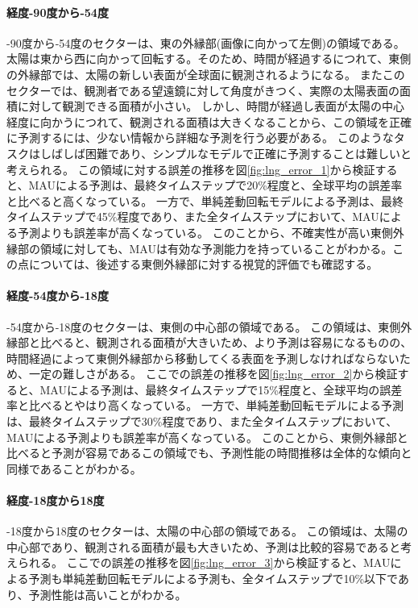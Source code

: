           \paragraph{経度-90度から-54度}
          -90度から-54度のセクターは、東の外縁部(画像に向かって左側)の領域である。
          太陽は東から西に向かって回転する。そのため、時間が経過するにつれて、東側の外縁部では、太陽の新しい表面が全球面に観測されるようになる。
          またこのセクターでは、観測者である望遠鏡に対して角度がきつく、実際の太陽表面の面積に対して観測できる面積が小さい。
          しかし、時間が経過し表面が太陽の中心経度に向かうにつれて、観測される面積は大きくなることから、この領域を正確に予測するには、少ない情報から詳細な予測を行う必要がある。
          このようなタスクはしばしば困難であり、シンプルなモデルで正確に予測することは難しいと考えられる。
          この領域に対する誤差の推移を図\ref{fig:lng_error_1}から検証すると、MAUによる予測は、最終タイムステップで20\%程度と、全球平均の誤差率と比べると高くなっている。
          一方で、単純差動回転モデルによる予測は、最終タイムステップで45\%程度であり、また全タイムステップにおいて、MAUによる予測よりも誤差率が高くなっている。
          このことから、不確実性が高い東側外縁部の領域に対しても、MAUは有効な予測能力を持っていることがわかる。この点については、後述する東側外縁部に対する視覚的評価でも確認する。

          \paragraph{経度-54度から-18度}
          -54度から-18度のセクターは、東側の中心部の領域である。
          この領域は、東側外縁部と比べると、観測される面積が大きいため、より予測は容易になるものの、時間経過によって東側外縁部から移動してくる表面を予測しなければならないため、一定の難しさがある。
          ここでの誤差の推移を図\ref{fig:lng_error_2}から検証すると、MAUによる予測は、最終タイムステップで15\%程度と、全球平均の誤差率と比べるとやはり高くなっている。
          一方で、単純差動回転モデルによる予測は、最終タイムステップで30\%程度であり、また全タイムステップにおいて、MAUによる予測よりも誤差率が高くなっている。
          このことから、東側外縁部と比べると予測が容易であるこの領域でも、予測性能の時間推移は全体的な傾向と同様であることがわかる。

          \paragraph{経度-18度から18度}
          -18度から18度のセクターは、太陽の中心部の領域である。
          この領域は、太陽の中心部であり、観測される面積が最も大きいため、予測は比較的容易であると考えられる。
          ここでの誤差の推移を図\ref{fig:lng_error_3}から検証すると、MAUによる予測も単純差動回転モデルによる予測も、全タイムステップで10\%以下であり、予測性能は高いことがわかる。
          


